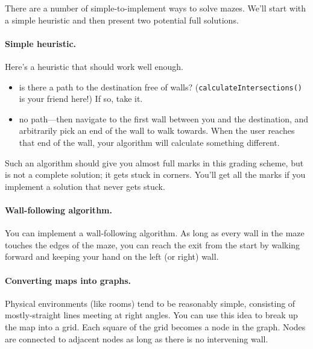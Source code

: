 \documentclass[10pt]{article}
\begin{document}


There are a number of simple-to-implement ways to solve mazes. We'll
start with a simple heuristic and then present two potential full
solutions.

\paragraph{Simple heuristic.} Here's a heuristic that
should work well enough.
\vspace*{-1em}
\begin{itemize}
\item is there a path to the destination free of walls? ({\tt calculateIntersections()} is your
friend here!) If so, take it.
\item no path---then navigate to the first wall between you and the
  destination, and arbitrarily pick an end of the wall to walk
  towards. When the user reaches that end of the wall, your algorithm will calculate
  something different.
\end{itemize}
Such an algorithm should give you almost full marks in this grading scheme, but is not a complete
solution; it gets stuck in corners. You'll get all the marks if you implement a solution that never gets stuck.

\paragraph{Wall-following algorithm.} You can implement a wall-following algorithm.
As long as every wall in the maze touches the edges of the maze, you
can reach the exit from the start by walking forward and keeping your
hand on the left (or right) wall. 

\paragraph{Converting maps into graphs.} 
Physical environments (like rooms) tend to be reasonably simple,
consisting of mostly-straight lines meeting at right angles. You can use
this idea to break up the map into a grid. Each square of the grid
becomes a node in the graph. Nodes are connected to adjacent
nodes as long as there is no intervening wall. 
\end{document}
